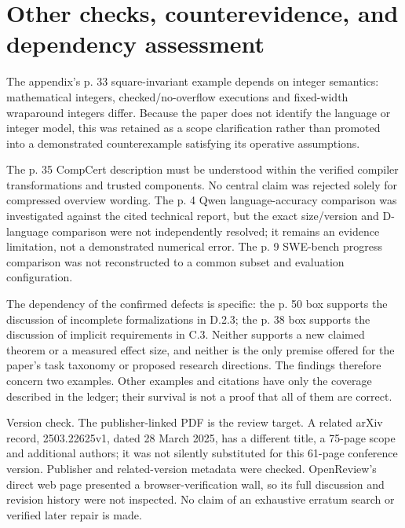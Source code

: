 \documentclass[10pt]{article}
\begin{document}
\section*{Other checks, counterevidence, and dependency assessment}
The appendix’s p. 33 square-invariant example depends on integer semantics: mathematical integers, checked/no-overflow executions and fixed-width wraparound integers differ. Because the paper does not identify the language or integer model, this was retained as a scope clarification rather than promoted into a demonstrated counterexample satisfying its operative assumptions.\par
The p. 35 CompCert description must be understood within the verified compiler transformations and trusted components. No central claim was rejected solely for compressed overview wording. The p. 4 Qwen language-accuracy comparison was investigated against the cited technical report, but the exact size/version and D-language comparison were not independently resolved; it remains an evidence limitation, not a demonstrated numerical error. The p. 9 SWE-bench progress comparison was not reconstructed to a common subset and evaluation configuration.\par
The dependency of the confirmed defects is specific: the p. 50 box supports the discussion of incomplete formalizations in D.2.3; the p. 38 box supports the discussion of implicit requirements in C.3. Neither supports a new claimed theorem or a measured effect size, and neither is the only premise offered for the paper’s task taxonomy or proposed research directions. The findings therefore concern two examples. Other examples and citations have only the coverage described in the ledger; their survival is not a proof that all of them are correct.\par
Version check. The publisher-linked PDF is the review target. A related arXiv record, 2503.22625v1, dated 28 March 2025, has a different title, a 75-page scope and additional authors; it was not silently substituted for this 61-page conference version. Publisher and related-version metadata were checked. OpenReview’s direct web page presented a browser-verification wall, so its full discussion and revision history were not inspected. No claim of an exhaustive erratum search or verified later repair is made.\par
\end{document}
